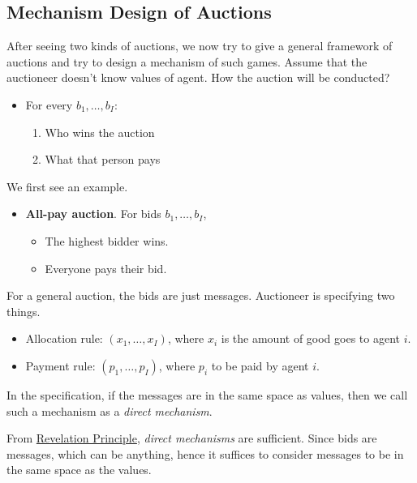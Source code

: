 \subsection{Mechanism Design of Auctions}
After seeing two kinds of auctions, we now try to give a general framework of auctions and try to design a mechanism of such games.
Assume that the auctioneer doesn't know values of agent. How the auction will be conducted?
\begin{itemize}
	\item For every \(b_1, \ldots , b_I\):
	      \begin{enumerate}
		      \item Who wins the auction
		      \item What that person pays
	      \end{enumerate}
\end{itemize}

\begin{eg}
	We first see an example.
	\begin{itemize}
		\item \textbf{All-pay auction}. For bids \(b_1, \ldots , b_I\),
		      \begin{itemize}
			      \item The highest bidder wins.
			      \item Everyone pays their bid.
		      \end{itemize}
	\end{itemize}
\end{eg}

For a general auction, the bids are just messages. Auctioneer is specifying two things.
\begin{itemize}
	\item Allocation rule: \((x_1, \ldots , x_I)\), where \(x_{i}\) is the amount of good goes to agent \(i\).
	\item Payment rule: \((p_1, \ldots , p_I)\), where \(p_{i}\) to be paid by agent \(i\).
\end{itemize}

\begin{definition}
	In the specification, if the messages are in the same space as values, then we call such a mechanism as a \emph{direct mechanism}.
\end{definition}

\begin{prev}
	From \hyperref[Revelation-Principle]{Revelation Principle}, \emph{direct mechanisms} are sufficient. Since bids are messages, which can be anything, hence
	it suffices to consider messages to be in the same space as the values.
\end{prev}

